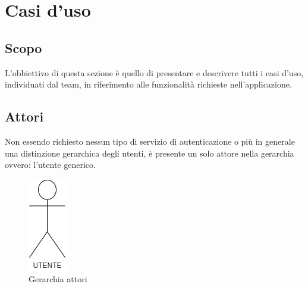 \section{Casi d'uso}
\subsection{Scopo}
L'obbiettivo di questa sezione è quello di presentare e descrivere tutti i casi d'uso, individuati dal team, in riferimento alle funzionalità richieste nell'applicazione.
\subsection{Attori}
Non essendo richiesto nessun tipo di servizio di autenticazione o più in generale una distinzione gerarchica degli utenti, è presente un solo attore nella gerarchia ovvero: l'utente generico.
\begin{figure}[h!]
    \centering
    \includegraphics[scale=0.50]{../../assets/Utente.png}
    \caption{Gerarchia attori}
\end{figure}


